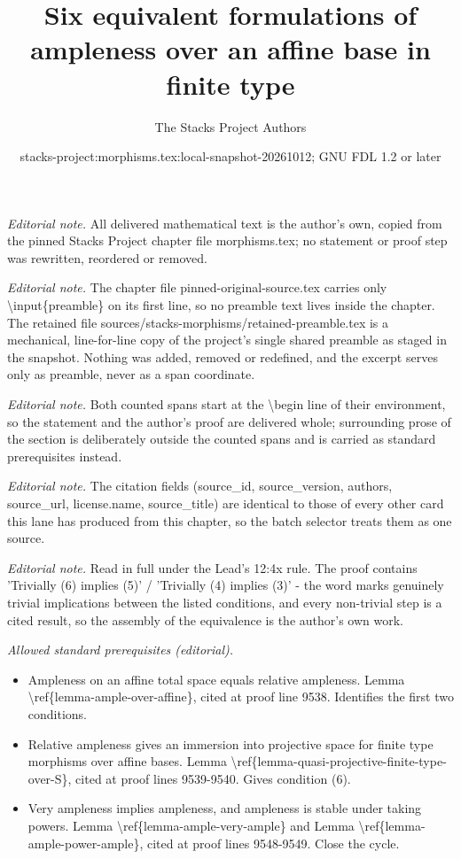 \documentclass[10pt,a4paper]{amsart}
\title{Six equivalent formulations of ampleness over an affine base in finite type}
\author{The Stacks Project Authors}
\date{stacks-project:morphisms.tex:local-snapshot-20261012; GNU FDL 1.2 or later}
\theoremstyle{plain}
\theoremstyle{definition}
\theoremstyle{remark}
\numberwithin{equation}{subsection}
\begin{document}
\maketitle
\setcounter{subsection}{1}
\noindent\textit{Editorial note.} All delivered mathematical text is the author's own, copied from the pinned Stacks Project chapter file morphisms.tex; no statement or proof step was rewritten, reordered or removed.\par\medskip
\noindent\textit{Editorial note.} The chapter file pinned-original-source.tex carries only \textbackslash{}input\{preamble\} on its first line, so no preamble text lives inside the chapter. The retained file sources/stacks-morphisms/retained-preamble.tex is a mechanical, line-for-line copy of the project's single shared preamble as staged in the snapshot. Nothing was added, removed or redefined, and the excerpt serves only as preamble, never as a span coordinate.\par\medskip
\noindent\textit{Editorial note.} Both counted spans start at the \textbackslash{}begin line of their environment, so the statement and the author's proof are delivered whole; surrounding prose of the section is deliberately outside the counted spans and is carried as standard prerequisites instead.\par\medskip
\noindent\textit{Editorial note.} The citation fields (source\_id, source\_version, authors, source\_url, license.name, source\_title) are identical to those of every other card this lane has produced from this chapter, so the batch selector treats them as one source.\par\medskip
\noindent\textit{Editorial note.} Read in full under the Lead's 12:4x rule. The proof contains 'Trivially (6) implies (5)' / 'Trivially (4) implies (3)' - the word marks genuinely trivial implications between the listed conditions, and every non-trivial step is a cited result, so the assembly of the equivalence is the author's own work.\par\medskip
\noindent\textit{Allowed standard prerequisites (editorial).}\begin{itemize}
\item Ampleness on an affine total space equals relative ampleness. Lemma \textbackslash{}ref\{lemma-ample-over-affine\}, cited at proof line 9538. Identifies the first two conditions.
\item Relative ampleness gives an immersion into projective space for finite type morphisms over affine bases. Lemma \textbackslash{}ref\{lemma-quasi-projective-finite-type-over-S\}, cited at proof lines 9539-9540. Gives condition (6).
\item Very ampleness implies ampleness, and ampleness is stable under taking powers. Lemma \textbackslash{}ref\{lemma-ample-very-ample\} and Lemma \textbackslash{}ref\{lemma-ample-power-ample\}, cited at proof lines 9548-9549. Close the cycle.
\end{itemize}\medskip
\end{document}
